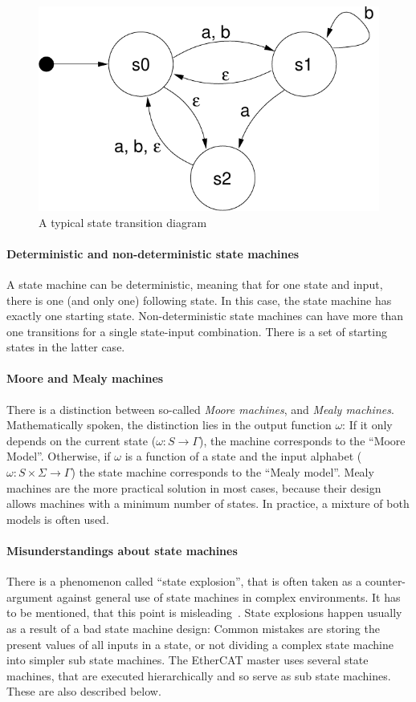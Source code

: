 \documentclass[a4paper,12pt,BCOR6mm,bibtotoc,idxtotoc]{scrbook}
\begin{document}
\begin{figure}[htbp]
  \centering
  \includegraphics[width=.5\textwidth]{images/statetrans}
  \caption{A typical state transition diagram}
  \label{fig:statetrans}
\end{figure}

\paragraph{Deterministic and non-deterministic state machines}

A state machine can be deterministic, meaning that for one state and
input, there is one (and only one) following state. In this case, the
state machine has exactly one starting state. Non-deterministic state
machines can have more than one transitions for a single state-input
combination. There is a set of starting states in the latter case.

\paragraph{Moore and Mealy machines}

There is a distinction between so-called \textit{Moore machines}, and
\textit{Mealy machines}. Mathematically spoken, the distinction lies
in the output function $\omega$: If it only depends on the current
state ($\omega: S \rightarrow \Gamma$), the machine corresponds to the
``Moore Model''. Otherwise, if $\omega$ is a function of a state and
the input alphabet ($\omega: S \times \Sigma \rightarrow \Gamma$) the
state machine corresponds to the ``Mealy model''. Mealy machines are
the more practical solution in most cases, because their design allows
machines with a minimum number of states. In practice, a mixture of
both models is often used.

\paragraph{Misunderstandings about state machines}

There is a phenomenon called ``state explosion'', that is often taken as a
counter-argument against general use of state machines in complex environments.
It has to be mentioned, that this point is misleading~\cite{fsmmis}. State
explosions happen usually as a result of a bad state machine design: Common
mistakes are storing the present values of all inputs in a state, or not
dividing a complex state machine into simpler sub state machines. The EtherCAT
master uses several state machines, that are executed hierarchically and so
serve as sub state machines. These are also described below.
\end{document}
